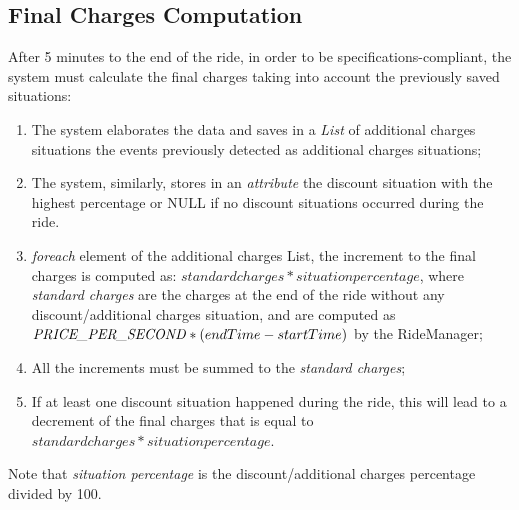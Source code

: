 \subsection{Final Charges Computation}
After 5 minutes to the end of the ride, in order to be specifications-compliant, the system must calculate the final charges taking into account the previously saved situations:
\begin{enumerate}
\item The system elaborates the data and saves in a \emph{List} of additional charges situations the events previously detected as additional charges situations;
\item The system, similarly, stores in an \emph{attribute} the discount situation with the highest percentage or NULL if no discount situations occurred during the ride.
\item \emph{foreach} element of the additional charges List, the increment to the final charges is computed as: $standard charges * situation percentage$, where \emph{standard charges} are the charges at the end of the ride without any discount/additional charges situation, and are computed as $\text{\emph{PRICE\_PER\_SECOND}} * ( endTime - startTime )$ by the RideManager;
\item All the increments must be summed to the \emph{standard charges};
\item If at least one discount situation happened during the ride, this will lead to a decrement of the final charges that is equal to $standard charges * situation percentage$.
\end{enumerate}
\noindent
Note that \emph{situation percentage} is the discount/additional charges percentage divided by 100.